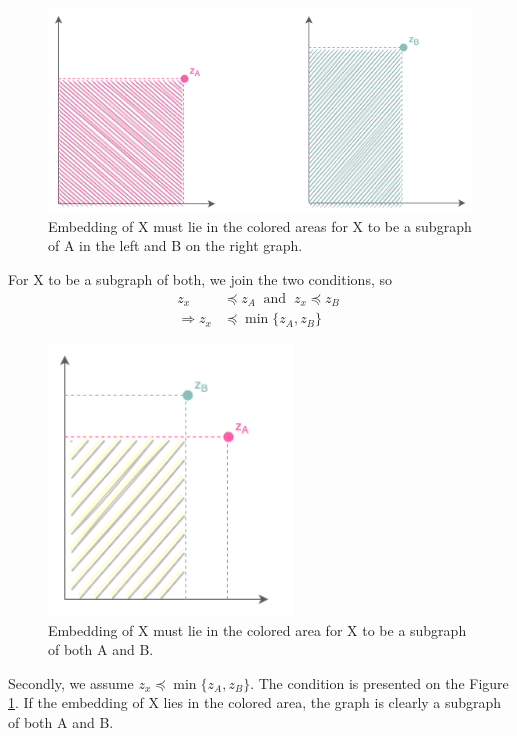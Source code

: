 \documentclass[a4paper,11pt]{article}
\begin{document}
\begin{figure}[ht!]
    \centering
    \includegraphics[width = 115mm]{Figures/2_3_a.png}
    \caption{Embedding of X must lie in the colored areas for X to be a subgraph of A in the left and B on the right graph.}
\end{figure}
\noindent
For X to be a subgraph of both, we join the two conditions, so 
\begin{align*} 
    z_x &\preceq z_A \ \text{ and } \ z_x \preceq z_B\
    \\
    \Rightarrow z_x &\preceq \min \{ z_A, z_B \}
\end{align*}

\begin{figure}[ht!]
    \centering
    \includegraphics[width = 65mm]{Figures/2_3_b.png}
    \caption{Embedding of X must lie in the colored area for X to be a subgraph of both A and B.}
    \label{pic:emb}
\end{figure}
\noindent
Secondly, we assume $z_x \preceq \min \{ z_A, z_B \}$.
The condition is presented on the Figure \ref{pic:emb}. If the embedding of X lies in the colored area, the graph is clearly a subgraph of both A and B.
  

\end{document}
